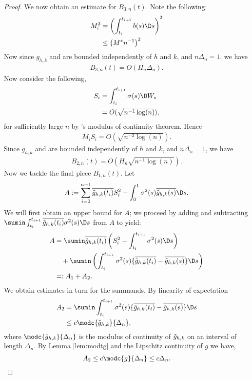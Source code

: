 \begin{proof}
We now obtain an estimate for  $B_{3,n}(t)$. Note the following:
\begin{align}
  M_i^2 & = \left(\int_{t_i}^{t_{i+1}} b(s) \D s\right)^2 \notag\\
  & \le \left(M^* n^{-1}\right)^2 
  \label{eq:m}
\end{align}
 Now since  $g_{h,k}$ and \tghk  are bounded independently of $h$ and $k$, and $n\Delta_n = 1$, we have
\begin{align}
  B_{3,n}(t) = O( H_n \Delta_n).
  \label{}
\end{align}
  Now consider the following, 
\begin{align}
  S_i & = \int_{t_i}^{t_{i+1}} \sigma(s) \D W_s\notag \\
  & = O (\sqrt{n^{-1} \log(n)}),\label{eq:rthree}
\end{align}
for sufficiently large $n$ by \levy's modulus of continuity theorem. Hence
\begin{align}
  M_i S_i = O(\sqrt{n^{-3} \log(n)}).\label{eq:ms}
\end{align}
Since  $g_{h,k}$ and \tghk  are bounded independently of $h$ and $k$, and $n\Delta_n = 1$, we have
\begin{align}
  B_{2,n}(t) = O( H_n \sqrt{n^{-1} \log(n)}).
  \label{}
\end{align}
Now we tackle the final piece $B_{1,n}(t)$. Let 
\begin{align}
  A  := \sum_{i=0}^{n-1}\btghki S_i^2 -\int_{0}^{1} \sigma^2(s) \btghks \D s.
\end{align}
We will first obtain an upper bound for $A$; we proceed by adding and subtracting $\sumin\int_{t_i}^{t_{i+1}}\btghki \sigma^2(s)  \D s$  from  $A$ to yield: 
\begin{align}
  A & = \sumin\btghki \left(S_i^2 -\int_{t_i}^{t_{i+1}} \sigma^2(s) \D s\right)\notag \\
  &\quad +  \sumin\left(\int_{t_i}^{t_{i+1}} \sigma^2(s) \{\btghki - \btghks\} \D s\right) \notag\\
  &=:A_{1} + A_{2} \notag.
  \label{}
\end{align}
We obtain estimates in turn for the summands. By linearity of expectation 
\begin{align}
  A_{2} &= \sumin \int_{t_i}^{t_{i+1}} \sigma^2(s)  \{\btghki - \btghks\} \D s\notag\\
  &\le c\modc{\tghk}{\Delta_n},\notag
  \label{}
\end{align}
where $\modc{\tghk}{\Delta_n}$ is the modulus of continuity of $\tilde{g}_{h,k}$ on an interval of length $\Delta_n$. By  Lemma \eqref{lem:modtg} and the Lipschitz continuity of $g$ we have, 
\begin{align}
  A_{2} \le c\modc{g}{\Delta_n} \le c \Delta_n.\notag 
  \label{}
\end{align}


\end{proof}
